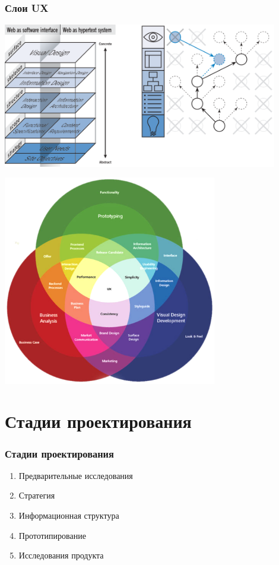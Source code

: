 \documentclass{../../slides-style}
\begin{document}
    \begin{frame}
        \frametitle{Слои UX}
        \begin{center}
            \includegraphics[width=0.9\textwidth]{uxLayers.png}
        \end{center}
    \end{frame}

    \begin{frame}
        \begin{center}
            \includegraphics[width=0.7\textwidth]{uxDesignPractices.png}
        \end{center}
    \end{frame}

    \section{Стадии проектирования}

    \begin{frame}
        \frametitle{Стадии проектирования}
        \begin{enumerate}
            \item Предварительные исследования
            \item Стратегия
            \item Информационная структура
            \item Прототипирование
            \item Исследования продукта
        \end{enumerate}
    \end{frame}
\end{document}
